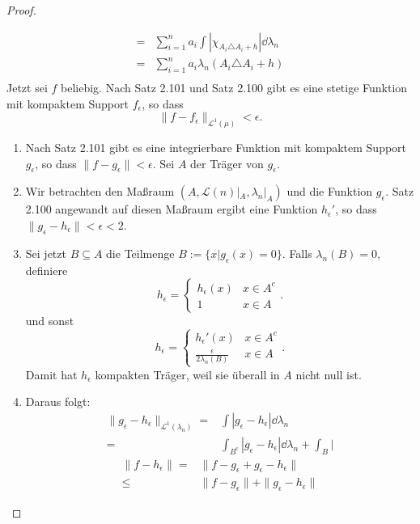 \begin{proof}
\begin{parts}
\begin{align*}
		=&\sum_{i=1}^n a_i\int |\chi_{A_i\triangle A_i+h}|\dd{\lambda_n}\\
		=&\sum_{i=1}^n a_i \lambda_n(A_i\triangle A_i+h)\\
	\end{align*}
	Jetzt sei $f$ beliebig. Nach Satz 2.101 und Satz 2.100 gibt es eine stetige Funktion mit kompaktem Support $f_\epsilon$, so dass
	\[
		\|f-f_\epsilon\|_{\mathcal{L}^1(\mu)}<\epsilon
	.\] 
	\begin{tcolorbox}[title=Existenz der Funktion]
		\begin{enumerate}[label=(\roman*)]
			\item Nach Satz 2.101 gibt es eine integrierbare Funktion mit kompaktem Support $g_\epsilon$, so dass $\|f-g_\epsilon\|<\epsilon$. Sei $A$ der Träger von $g_\epsilon$.
			\item Wir betrachten den Maßraum $(A, \mathcal{L}(n)|_A, \lambda_n|_A)$ und die Funktion $g_\epsilon$. Satz 2.100 angewandt auf diesen Maßraum ergibt eine Funktion $h_\epsilon'$, so dass $\|g_\epsilon-h_\epsilon\|<\epsilon < 2$.
			\item Sei jetzt $B\subseteq A$ die Teilmenge $B:=\{x|g_\epsilon(x)=0\} $. Falls $\lambda_n(B)=0$, definiere
				\[
				h_\epsilon=\begin{cases}
					h_\epsilon(x) & x\in A^c\\
					1 & x\in A
				\end{cases}
				.\] 
				und sonst
				\[
				h_\epsilon=\begin{cases}
					h_\epsilon'(x) & x\in A^c\\
					\frac{\epsilon}{2\lambda_n(B)} & x\in A
				\end{cases}
				.\] 
				Damit hat $h_\epsilon$ kompakten Träger, weil sie überall in $A$ nicht null ist. 
			\item Daraus folgt:
				\begin{align*}
					\|g_\epsilon-h_\epsilon\|_{\mathcal{L}^1(\lambda_n)}=&\int |g_\epsilon-h_\epsilon|\dd{\lambda_n}\\
					=&\int_{B^c}|g_\epsilon-h_\epsilon|\dd{\lambda_n}+\int_{B}|
				\end{align*}
				\begin{align*}
					\|f-h_\epsilon\|=&\|f-g_\epsilon+g_\epsilon-h_\epsilon\|\\
					\le&\|f-g_\epsilon\|+\|g_\epsilon-h_\epsilon\|
				\end{align*}
		\end{enumerate}
	\end{tcolorbox}

\end{parts}
\end{proof}

